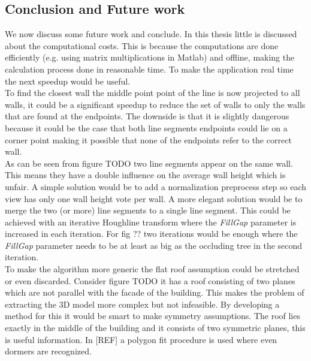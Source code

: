 \documentclass[10pt]{article}
\begin{document}

\subsection{Conclusion and Future work}
We now discuss some future work and conclude.  In this thesis little is discussed about the computational costs. This is because the computations are done efficiently (e.g. using matrix multiplications in Matlab) and offline, making the calculation process done in reasonable time. To make the application real time the next speedup would be useful.\\
To find the closest wall the middle point point of the line is now projected to all walls, it could be a significant speedup to reduce the set of walls to only the walls that are found at the endpoints. The downside is that it is slightly dangerous because it could be the case that both line segments endpoints could lie on a corner point making it possible that none of the endpoints refer to the correct wall.\\

As can be seen from figure TODO%
two line segments appear on the same wall. This means they have a double influence on the average wall height which is unfair. A simple solution would be to add a normalization preprocess step so each view has only one wall height vote per wall. A more elegant solution would be to merge the two (or more) line segments to a single line segment. This could be achieved with an iterative Houghline transform where the \emph{FillGap} parameter is increased in each iteration. For fig ?? %
two iterations would be enough where the \emph{FillGap} parameter needs to be at least as big as the occluding tree in the second iteration.\\
To make the algorithm more generic the flat roof assumption could be stretched or even discarded.
Consider figure TODO %
it has a roof consisting of two planes which are not parallel with the facade of the building. This makes the problem of extracting the 3D model more complex but not 
infeasible. By developing a method for this it would be smart to make symmetry assumptions. The roof lies exactly in the middle of the building and it consists of two symmetric planes, this is useful information. In 
[REF] a polygon fit procedure is used where even dormers are recognized.\\
\end{document}
